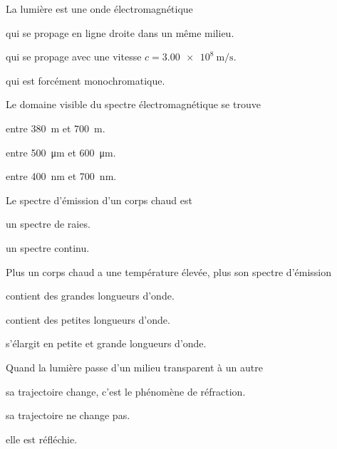 \begin{qcm}{La lumière est une onde électromagnétique}
  \item\reponseQCM qui se propage en ligne droite dans un même milieu.
  \item\reponseQCM qui se propage avec une vitesse $c = \qty{3,00e8}{\m\per\s}$.
  \item qui est forcément monochromatique.
\end{qcm}
%
\begin{qcm}{Le domaine visible du spectre électromagnétique se trouve}
  \item entre \qty{380}{\m} et \qty{700}{\m}.
  \item entre \qty{500}{\micro\m} et \qty{600}{\micro\m}.
  \item\reponseQCM entre \qty{400}{\nano\m} et \qty{700}{\nano\m}.
\end{qcm}
%
\begin{qcm}{Le spectre d'émission d'un corps chaud est}
  \item un spectre de raies.
  \item\reponseQCM un spectre continu.
\end{qcm}
%
\begin{qcm}{Plus un corps chaud a une température élevée, plus son spectre d'émission}
  \item contient des grandes longueurs d'onde.
  \item\reponseQCM contient des petites longueurs d'onde.
  \item s'élargit en petite et grande longueurs d'onde.
\end{qcm}
%
\begin{qcm}{Quand la lumière passe d'un milieu transparent à un autre}
  \item\reponseQCM sa trajectoire change, c'est le phénomène de réfraction.
  \item sa trajectoire ne change pas.
  \item elle est réfléchie.
\end{qcm}


\newpage
\vspace*{-36pt}


